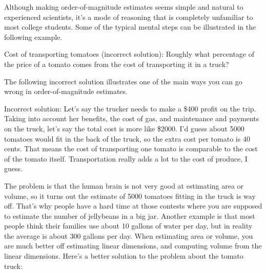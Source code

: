 Although making order-of-magnitude estimates seems simple
and natural to experienced scientists, it's a mode of
reasoning that is completely unfamiliar to most college
students. Some of the typical mental steps can be illustrated
in the following example.

\begin{exmp}
Cost of transporting tomatoes (incorrect solution):
Roughly what percentage of the price of a tomato
comes from the cost of transporting it in a truck?

The following incorrect solution illustrates one of the main
ways you can go wrong in order-of-magnitude estimates.

Incorrect solution: Let's say the trucker needs to make a
\$400 profit on the trip. Taking into account her benefits,
the cost of gas, and maintenance and payments on the truck,
let's say the total cost is more like \$2000. I'd guess
about 5000 tomatoes would fit in the back of the truck, so
the extra cost per tomato is 40 cents. That means the cost
of transporting one tomato is comparable to the cost of the
tomato itself. Transportation really adds a lot to the cost
of produce, I guess.
\end{exmp}
\divider
\vspace{2mm}

The problem is that the human brain is not very good at
estimating area or volume, so it turns out the estimate of
5000 tomatoes fitting in the truck is way off. That's why
people have a hard time at those contests where you are
supposed to estimate the number of jellybeans in a big jar.
Another example is that most people think their families use
about 10 gallons of water per day, but in reality the
average is about 300 gallons per day. When estimating area
or volume, you are much better off estimating linear
dimensions, and computing volume from the linear dimensions.
Here's a better solution to the problem about the tomato truck:


